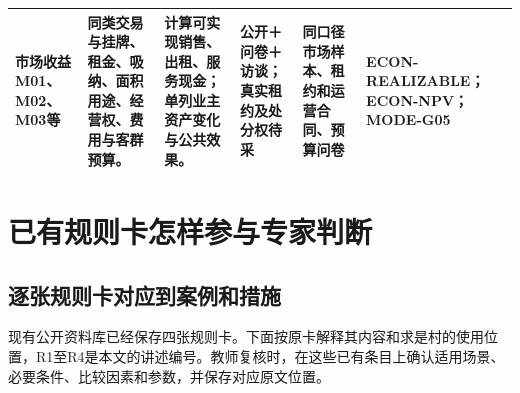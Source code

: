 \documentclass[UTF8,11pt,fontset=windows]{ctexart}
\begin{document}
\begin{landscape}
\begin{longtable}{@{}L{21mm}L{55mm}L{50mm}L{34mm}L{45mm}L{32mm}@{}}
市场收益
\newline M01、M02、M03等 & 同类交易与挂牌、租金、吸纳、面积用途、经营权、费用与客群预算。 & 计算可实现销售、出租、服务现金；单列业主资产变化与公共效果。 & 公开＋问卷＋访谈；真实租约及处分权待采 & 同口径市场样本、租约和运营合同、预算问卷 & ECON-REALIZABLE；ECON-NPV；MODE-G05\\
\bottomrule\end{longtable}
\normalsize
\end{landscape}

\section{已有规则卡怎样参与专家判断}

\subsection{逐张规则卡对应到案例和措施}

现有公开资料库已经保存四张规则卡。下面按原卡解释其内容和求是村的使用位置，R1至R4是本文的讲述编号。教师复核时，在这些已有条目上确认适用场景、必要条件、比较因素和参数，并保存对应原文位置。
\end{document}
